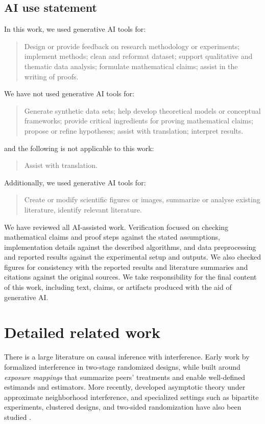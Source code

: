 \documentclass[twoside,letterpaper]{article}
\theoremstyle{plain}
\theoremstyle{definition}
\theoremstyle{remark}
\begin{document}
\subsection*{AI use statement}
In this work, we used generative AI tools for: 
\begin{quote}
    Design or provide feedback on research methodology or experiments; implement methods; clean and reformat dataset; support qualitative and thematic data analysis; formulate mathematical claims; assist in the writing of proofs.
\end{quote}
 We have not used generative AI tools for: 
\begin{quote}
    Generate synthetic data sets; help develop theoretical models or conceptual frameworks; provide critical ingredients for proving mathematical claims; propose or refine hypotheses; assist with translation; interpret results. 
\end{quote}
and the following is not applicable to this work: 
\begin{quote}
    Assist with translation.
\end{quote}
Additionally, we used generative AI tools for: 
\begin{quote}
    Create or modify scientific figures or images, summarize or analyse existing literature, identify relevant literature.
\end{quote}
We have reviewed all AI-assisted work. Verification focused on checking mathematical claims and proof steps against the stated assumptions, implementation details against the described algorithms, and data preprocessing and reported results against the experimental setup and outputs. We also checked figures for consistency with the reported results and literature summaries and citations against the original sources. We take responsibility for the final content of this work, including text, claims, or artifacts produced with the aid of generative AI.




\clearpage




\clearpage
\appendix
\onecolumn
{}

\section{Detailed related work}\label{app:related-work}
There is a large literature on causal inference with interference. Early work by \citet{hudgens2008toward} formalized interference in two-stage randomized designs, while \citet{aronow2017estimating} built around \emph{exposure mappings} that summarize peers’ treatments
and enable well-defined estimands and estimators. More recently, \citep{leung2022causal, gao2023causal} developed asymptotic theory under approximate neighborhood interference, and specialized settings such as bipartite experiments, clustered designs, and two-sided randomization have also been studied \citep{papadogeorgou2025causal, lu2025design, su2021model, Masoero2026multiple}.
\end{document}
